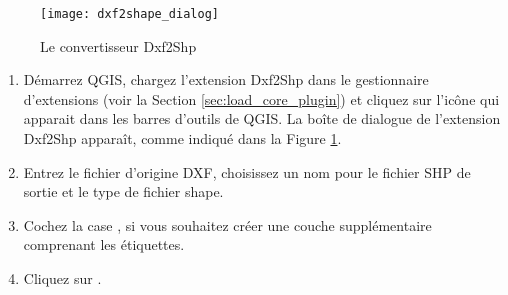 \begin{figure}[ht]
   \begin{center}
   \caption{Le convertisseur Dxf2Shp\nixcaption}\label{fig:dxf2shape_dialog}\smallskip
   \texttt{[image: dxf2shape\_dialog]}
\end{center}  
\end{figure}

\begin{enumerate}
  \item D\'emarrez QGIS, chargez l'extension Dxf2Shp dans le gestionnaire d'extensions (voir la Section 
  \ref{sec:load_core_plugin}) et cliquez sur l'ic\^one  
  qui apparait dans les barres d'outils de QGIS. La bo\^ite de dialogue de l'extension Dxf2Shp appara\^it, comme indiqu\'e dans la Figure 
  \ref{fig:dxf2shape_dialog}.
  \item Entrez le fichier d'origine DXF, choisissez un nom pour le fichier SHP de sortie et le type de fichier shape.
  \item Cochez la case , si vous souhaitez cr\'eer une couche suppl\'ementaire comprenant les \'etiquettes.
  \item Cliquez sur . 
\end{enumerate}

\newpage